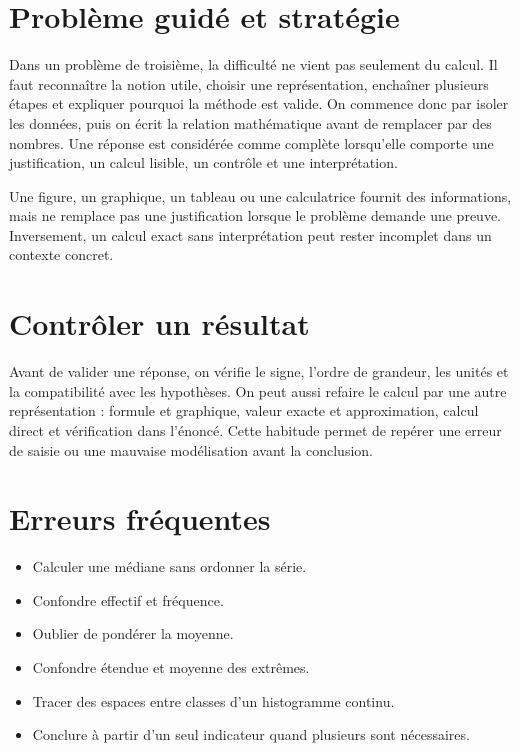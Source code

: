 \section{Problème guidé et stratégie}
Dans un problème de troisième, la difficulté ne vient pas seulement du calcul. Il faut reconnaître la notion utile, choisir une représentation, enchaîner plusieurs étapes et expliquer pourquoi la méthode est valide. On commence donc par isoler les données, puis on écrit la relation mathématique avant de remplacer par des nombres. Une réponse est considérée comme complète lorsqu’elle comporte une justification, un calcul lisible, un contrôle et une interprétation.

\begin{attention}
Une figure, un graphique, un tableau ou une calculatrice fournit des informations, mais ne remplace pas une justification lorsque le problème demande une preuve. Inversement, un calcul exact sans interprétation peut rester incomplet dans un contexte concret.
\end{attention}

\section{Contrôler un résultat}
Avant de valider une réponse, on vérifie le signe, l’ordre de grandeur, les unités et la compatibilité avec les hypothèses. On peut aussi refaire le calcul par une autre représentation : formule et graphique, valeur exacte et approximation, calcul direct et vérification dans l’énoncé. Cette habitude permet de repérer une erreur de saisie ou une mauvaise modélisation avant la conclusion.

\section{Erreurs fréquentes}
\begin{itemize}
\item Calculer une médiane sans ordonner la série.
\item Confondre effectif et fréquence.
\item Oublier de pondérer la moyenne.
\item Confondre étendue et moyenne des extrêmes.
\item Tracer des espaces entre classes d’un histogramme continu.
\item Conclure à partir d’un seul indicateur quand plusieurs sont nécessaires.
\end{itemize}

